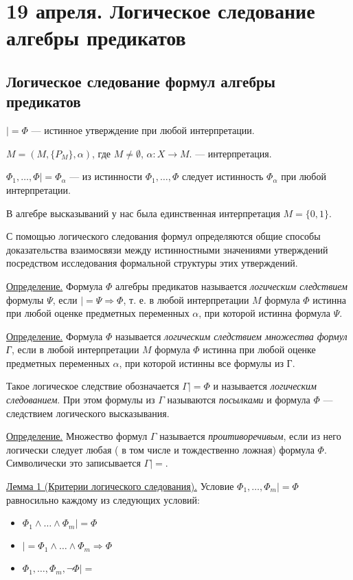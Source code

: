 \chapter{19 апреля. Логическое следование алгебры предикатов}
\section{Логическое следование формул алгебры предикатов}
$|= \Phi$ --- истинное утверждение при любой интерпретации.

$M = (M, \{P_M\}, \alpha)$, где $M \neq \emptyset$, $\alpha: X \rightarrow M$. --- интерпретация.

$\Phi_1, \dots, \Phi |= \Phi_\alpha$ --- из истинности $\Phi_1, \dots, \Phi$ следует истинность $\Phi_\alpha$ при любой интерпретации.

В алгебре высказываний у нас была единственная интерпретация $M = \{0,1\}$.

С помощью логического следования формул определяются общие способы доказательства взаимосвязи между истинностными значениями утверждений посредством исследования формальной структуры этих утверждений.

\underline{Определение.} Формула $\Phi$ алгебры предикатов называется {\it логическим следствием } формулы $\Psi$, если $|= \Psi \Rightarrow \Phi$, т. е. в любой интерпретации $M$ формула $\Phi$ истинна при любой оценке предметных переменных $\alpha$, при которой истинна формула $\Psi$.

\underline{Определение.} Формула $\Phi$ называется {\it логическим следствием множества формул Г}, если в любой интерпретации $M$ формула $\Phi$ истинна при любой оценке предметных переменных $\alpha$, при которой истинны все формулы из Г.

Такое логическое следствие обозначается $\Gamma |= \Phi$ и называется {\it логическим следованием}. При этом формулы из $\Gamma$ называются {\it посылками} и формула $\Phi$ --- следствием логического высказывания.

\underline{Определение.} Множество формул $\Gamma$ называется {\it проитиворечивым}, если из него логически следует любая ( в том числе и тождественно ложная) формула $\Phi$. Символически это записывается $\Gamma |= $.

\underline{Лемма 1 (Критерии логического следования).} Условие $\Phi_1, \dots, \Phi_m |= \Phi$ равносильно каждому из следующих условий:
\begin{itemize}
    \item $\Phi_1 \land \dots \land \Phi_m |= \Phi$
    \item $|= \Phi_1 \land \dots \land \Phi_m \Rightarrow \Phi$
    \item $\Phi_1, \dots, \Phi_m, \neg \Phi |= $
\end{itemize}

